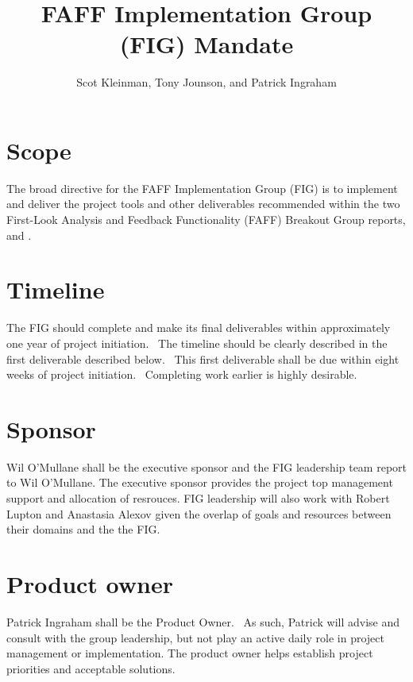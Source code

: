 \documentclass[SE,authoryear,lsstdraft]{lsstdoc}
\title{FAFF Implementation Group (FIG) Mandate}
\author{%
Scot Kleinman,
Tony Jounson,
and
Patrick Ingraham
}
\date{\vcsDate}
\begin{document}
\maketitle

\section{Scope}
The broad directive for the FAFF Implementation Group (FIG) is to
implement and deliver the project tools and other deliverables recommended
within the two First-Look Analysis and Feedback Functionality (FAFF)
Breakout Group reports,  and .

\section{Timeline}
The FIG should complete and make its final deliverables within
approximately one year of project initiation.  The timeline should be
clearly described in the first deliverable described below.  This first
deliverable shall be due within eight weeks of project initiation. 
Completing work earlier is highly desirable.


\section{Sponsor}
Wil O’Mullane shall be the executive sponsor and the FIG leadership
team report to Wil O’Mullane.  The executive sponsor provides the project top management support and allocation of resrouces.
FIG leadership will also work with Robert Lupton and
Anastasia Alexov given the overlap of goals and
resources between their domains and the the FIG.



\section{Product owner}
Patrick Ingraham shall be the Product Owner.  As such, Patrick will
advise and consult with the group leadership, but not play an active
daily role in project management or implementation.  The product owner
helps establish project priorities and acceptable solutions.
\end{document}
